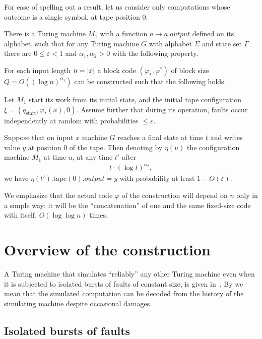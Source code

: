 \documentclass[12pt]{memoir}
\renewcommand{\le}{\leq}
\newcommand{\Output}{\mathit{output}}
\newcommand{\start}{\mathrm{start}}
\newcommand{\tape}{\mathrm{tape}}
\begin{document}
For ease of spelling out a result, let us consider only computations whose outcome
is a single symbol, at tape position 0.

\begin{theorem}\label{thm:main-main}
There is a Turing machine \( M_{1} \) with a 
function \( a\mapsto a.\Output \) defined on its alphabet, 
such that
for any Turing machine \( G \) with alphabet \( \Sigma \) and state set \( \Gamma \)
there are \( 0\le\varepsilon <1 \) and \( \alpha_{1},\alpha_{2}>0 \) 
with the following property.

For each input length \( n=\lvert x \rvert \) a block code
\( (\varphi_*, \varphi^*) \) of block size \( Q=O((\log n)^{\alpha_{1}}) \) can be constructed 
such that the following holds.

Let \( M_1 \) start its work from its initial state,
and the initial tape configuration \( \xi=(q_{\start},\varphi_{*}(x),0) \).
Assume further that
during its operation, faults occur independently at random
with probabilities \( \le \varepsilon \).

Suppose that on input \( x \) machine \( G \) reaches a final state at time \( t \) and writes
value \( y \) at position 0 of the tape.
Then denoting by \( \eta(u) \) the configuration machine \( M_{1} \) at time \( u \),
at any time \( t' \) after
 \begin{align*}
   t\cdot (\log t)^{\alpha_{2}},
 \end{align*}
we have \( \eta(t').\tape(0).\Output= y \)
with probability at least \( 1 - O(\varepsilon) \).
\end{theorem}

We emphasize that the actual
code \( \varphi \) of the construction will depend on \( n \) only in a simple way:
it will be the ``concatenation'' of one and the same fixed-size
code with itself, \( O(\log\log n) \) times.


\section{Overview of the construction}

A Turing machine that simulates ``reliably'' any other
Turing machine even when it is subjected to isolated bursts of faults of constant size,
is given in~\cite{burstyTuring13}.
By  we mean that the 
simulated computation can be decoded from the history
of the simulating machine despite occasional damages.


\subsection{Isolated bursts of faults}\label{sec:bursts}
\end{document}
